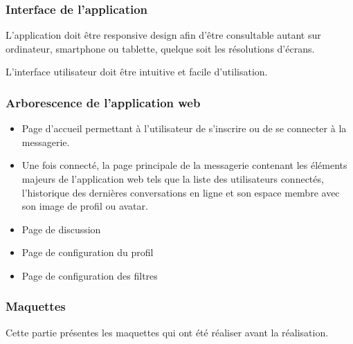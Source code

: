 \subsubsection{Interface de l’application}

\par L’application doit être responsive design afin d’être consultable autant sur ordinateur, smartphone ou tablette, quelque soit les résolutions d’écrans. 

\par L’interface utilisateur doit être intuitive et facile d’utilisation. 

\subsubsection{Arborescence de l’application web}

\begin{itemize}
	\item Page d'accueil permettant à l’utilisateur de s'inscrire ou de se connecter à la messagerie.	
	\item Une fois connecté, la page principale de la messagerie contenant les éléments majeurs de l'application web tels que la liste des utilisateurs connectés, l’historique des dernières conversations en ligne et son espace membre avec son image de profil ou avatar.
	\item Page de discussion 
	\item Page de configuration du profil
	\item Page de configuration des filtres
\end{itemize}

\subsubsection{Maquettes}

Cette partie présentes les maquettes qui ont été réaliser avant la réalisation. 

